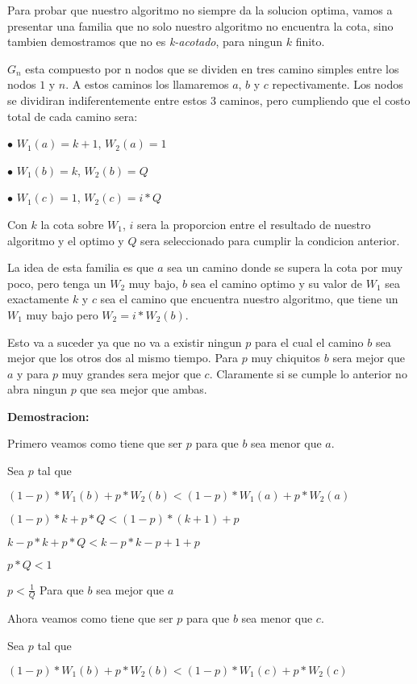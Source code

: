 Para probar que nuestro algoritmo no siempre da la solucion optima, vamos a presentar una familia que no solo nuestro algoritmo no encuentra la cota, sino tambien demostramos que no es \emph{k-acotado}, para ningun $k$ finito.


$G_n$ esta compuesto por n nodos que se dividen en tres camino simples entre los nodos $1$ y $n$. A estos caminos los llamaremos $a$, $b$ y $c$ repectivamente. Los nodos se dividiran indiferentemente entre estos 3 caminos, pero cumpliendo que el costo total de cada camino sera:

$\bullet$ $W_1(a) = k+1$, $W_2(a)=1$

$\bullet$ $W_1(b) = k$, $W_2(b)=Q$

$\bullet$ $W_1(c) = 1$, $W_2(c)=i*Q$

Con $k$ la cota sobre $W_1$, $i$ sera la proporcion entre el resultado de nuestro algoritmo y el optimo y $Q$ sera seleccionado para cumplir la condicion anterior.

La idea de esta familia es que $a$ sea un camino donde se supera la cota por muy poco, pero tenga un $W_2$ muy bajo, $b$ sea el camino optimo y su valor de $W_1$ sea exactamente $k$ y $c$ sea el camino que encuentra nuestro algoritmo, que tiene un $W_1$ muy bajo pero $W_2 = i * W_2(b)$.

Esto va a suceder ya que no va a existir ningun $p$ para el cual el camino $b$ sea mejor que los otros dos al mismo tiempo. Para $p$ muy chiquitos $b$ sera mejor que $a$ y para $p$ muy grandes sera mejor que $c$. Claramente si se cumple lo anterior no abra ningun $p$ que sea mejor que ambas.

\textbf{Demostracion:}

Primero veamos como tiene que ser $p$ para que $b$ sea menor que $a$.

Sea $p$ tal que 

$(1-p)*W_1(b)+p*W_2(b) < (1-p)*W_1(a)+p*W_2(a)$

$(1-p)*k+p*Q < (1-p)*(k+1)+p$

$k-p*k+p*Q < k-p*k-p+1+p$

$p*Q < 1$

$p < \frac{1}{Q}$ Para que $b$ sea mejor que $a$

Ahora veamos como tiene que ser $p$ para que $b$ sea menor que $c$.

Sea $p$ tal que 

$(1-p)*W_1(b)+p*W_2(b) < (1-p)*W_1(c)+p*W_2(c)$

